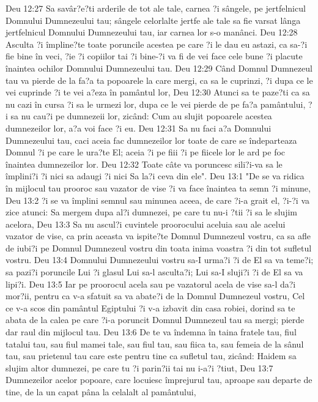 Deu 12:27  Sa savâr?e?ti arderile de tot ale tale, carnea ?i sângele, pe jertfelnicul Domnului Dumnezeului tau; sângele celorlalte jertfe ale tale sa fie varsat lânga jertfelnicul Domnului Dumnezeului tau, iar carnea lor s-o manânci.
Deu 12:28  Asculta ?i împline?te toate poruncile acestea pe care ?i le dau eu astazi, ca sa-?i fie bine în veci, ?ie ?i copiilor tai ?i bine-?i va fi de vei face cele bune ?i placute înaintea ochilor Domnului Dumnezeului tau.
Deu 12:29  Când Domnul Dumnezeul tau va pierde de la fa?a ta popoarele la care mergi, ca sa le cuprinzi, ?i dupa ce le vei cuprinde ?i te vei a?eza în pamântul lor,
Deu 12:30  Atunci sa te paze?ti ca sa nu cazi în cursa ?i sa le urmezi lor, dupa ce le vei pierde de pe fa?a pamântului, ?i sa nu cau?i pe dumnezeii lor, zicând: Cum au slujit popoarele acestea dumnezeilor lor, a?a voi face ?i eu.
Deu 12:31  Sa nu faci a?a Domnului Dumnezeului tau, caci aceia fac dumnezeilor lor toate de care se îndeparteaza Domnul ?i pe care le ura?te El; aceia ?i pe fiii ?i pe fiicele lor le ard pe foc înaintea dumnezeilor lor.
Deu 12:32  Toate câte va poruncesc sili?i-va sa le împlini?i ?i nici sa adaugi ?i nici Sa la?i ceva din ele".
Deu 13:1  "De se va ridica în mijlocul tau prooroc sau vazator de vise ?i va face înaintea ta semn ?i minune,
Deu 13:2  ?i se va împlini semnul sau minunea aceea, de care ?i-a grait el, ?i-?i va zice atunci: Sa mergem dupa al?i dumnezei, pe care tu nu-i ?tii ?i sa le slujim acelora,
Deu 13:3  Sa nu ascul?i cuvintele proorocului aceluia sau ale acelui vazator de vise, ca prin aceasta va ispite?te Domnul Dumnezeul vostru, ca sa afle de iubi?i pe Domnul Dumnezeul vostru din toata inima voastra ?i din tot sufletul vostru.
Deu 13:4  Domnului Dumnezeului vostru sa-I urma?i ?i de El sa va teme?i; sa pazi?i poruncile Lui ?i glasul Lui sa-l asculta?i; Lui sa-I sluji?i ?i de El sa va lipi?i.
Deu 13:5  Iar pe proorocul acela sau pe vazatorul acela de vise sa-l da?i mor?ii, pentru ca v-a sfatuit sa va abate?i de la Domnul Dumnezeul vostru, Cel ce v-a scos din pamântul Egiptului ?i v-a izbavit din casa robiei, dorind sa te abata de la calea pe care ?i-a poruncit Domnul Dumnezeul tau sa mergi; pierde dar raul din mijlocul tau.
Deu 13:6  De te va îndemna în taina fratele tau, fiul tatalui tau, sau fiul mamei tale, sau fiul tau, sau fiica ta, sau femeia de la sânul tau, sau prietenul tau care este pentru tine ca sufletul tau, zicând: Haidem sa slujim altor dumnezei, pe care tu ?i parin?ii tai nu i-a?i ?tiut,
Deu 13:7  Dumnezeilor acelor popoare, care locuiesc împrejurul tau, aproape sau departe de tine, de la un capat pâna la celalalt al pamântului,
